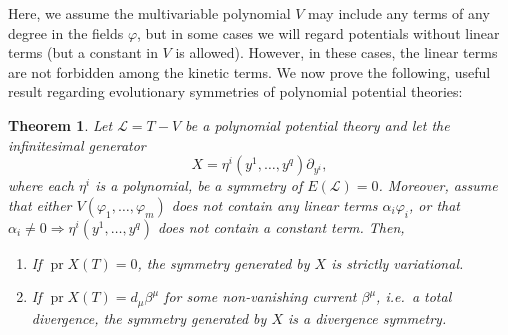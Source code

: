 \documentclass[a4paper,hidelinks, 12pt]{article}
\numberwithin{equation}{section}
\newtheorem{theorem}{Theorem}
\theoremstyle{plain}
\newcommand{\mc}{\mathcal}
\newcommand{\on}{\operatorname}
\begin{document}
Here, we assume the multivariable polynomial $V$ may include any terms of any degree in the fields $\varphi$, but in some cases we will regard potentials without linear terms (but a constant in $V$ is allowed). 
However, in these cases, the linear terms are not forbidden among the kinetic terms.
 We now prove the following, useful result regarding evolutionary symmetries of polynomial potential theories: 
\begin{theorem}\label{P:prXannTannV}
Let $\mc{L}=T-V$ be a polynomial potential theory and let the infinitesimal generator 
\[
X=\eta^i(y^1,\ldots,y^{q})\partial_{y^i}, 
\]
where each $\eta^i$ is a polynomial, be a symmetry of $E(\mc{L})=0$. Moreover, assume that either $V(\varphi_1,\ldots,\varphi_m)$ does not contain any linear terms $\alpha_i \varphi_i$, or that
 $\alpha_i\ne 0 \Rightarrow \eta^i(y^1,\ldots,y^{q})$ does not
contain a constant term.
Then,   
\begin{enumerate}[label=(\roman*)]
 \item If $\on{pr}X(T)=0$, the symmetry generated by $X$ is strictly variational.
  \item If $\on{pr}X(T)=d_\mu \beta^\mu$ for some non-vanishing current $\beta^\mu$, i.e.~a total divergence, 
        the symmetry generated by $X$ is a divergence symmetry.
\end{enumerate}
\end{theorem}
\end{document}
